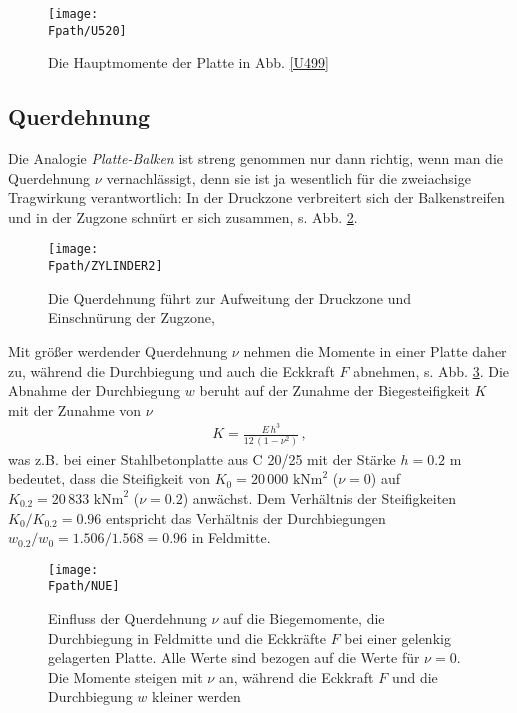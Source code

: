 \begin{figure}[tbp]
\centering
\texttt{[image: \\Fpath/U520]}
\caption{Die Hauptmomente der Platte in Abb. \ref{U499} } \label{U520}
\end{figure}%
{\textcolor{sectionTitleBlue}{\subsection{Querdehnung}}}
Die Analogie {\em Platte-Balken\/} ist streng genommen nur dann richtig, wenn man die Querdehnung $\nu$ vernachl\"{a}ssigt, denn sie ist ja wesentlich f\"{u}r die zweiachsige Tragwirkung verantwortlich: In der Druckzone verbreitert sich der Balkenstreifen und in der Zugzone schn\"{u}rt er sich zusammen, s. Abb. \ref{Zylinder2}.

\begin{figure}[tbp]
\centering
\if {} \sidecaption \fi
\texttt{[image: \\Fpath/ZYLINDER2]}
\caption{Die Querdehnung f\"{u}hrt zur Aufweitung der Druckzone und Einschn\"{u}rung der
Zugzone, \protect \cite{Stiglat}} \label{Zylinder2}
\end{figure}%
Mit gr\"{o}{\ss}er werdender Querdehnung $\nu$ nehmen die Momente in einer Platte daher zu, w\"{a}hrend die Durchbiegung und auch die Eckkraft $F$ abnehmen, s. Abb. \ref{Nue}. Die Abnahme der Durchbiegung $w$ beruht auf der Zunahme der Biegesteifigkeit $K$ mit der Zunahme von $\nu$
\begin{align}
K = \frac{E\,h^3}{12\,(1 - \nu^2)}\,,
\end{align}
was z.B. bei einer Stahlbetonplatte aus C 20/25 mit der St\"{a}rke $h = 0.2$ m bedeutet, dass die Steifigkeit von $K_0 = 20\,000\,\, \mbox{kNm}^2$ ($\nu = 0$) auf $K_{0.2} = 20\,833 \,\, \mbox{kNm}^2$ ($\nu = 0.2$) anw\"{a}chst. Dem Verh\"{a}ltnis der Steifigkeiten $K_0/K_{0.2} = 0.96$ entspricht das Verh\"{a}ltnis der Durchbiegungen $w_{0.2}/w_0 = 1.506/1.568 = 0.96$ in Feldmitte.
\begin{figure}[tbp]
\centering
\if {} \sidecaption \fi
\texttt{[image: \\Fpath/NUE]}
\caption{Einfluss der Querdehnung $\nu$ auf die Biegemomente, die Durchbiegung in
Feldmitte und die Eckkr\"{a}fte $F$ bei einer gelenkig gelagerten Platte. Alle Werte sind
bezogen auf die Werte f\"{u}r $\nu = 0$. Die Momente steigen mit $\nu$ an, w\"{a}hrend die
Eckkraft $F$ und die Durchbiegung $w$ kleiner werden} \label{Nue}
\end{figure}%

